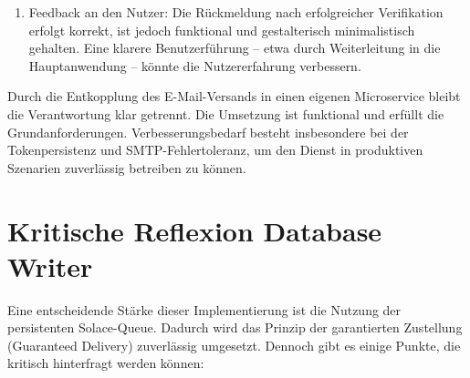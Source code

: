 \begin{enumerate}
    \item Feedback an den Nutzer: Die Rückmeldung nach erfolgreicher Verifikation erfolgt korrekt, ist jedoch funktional und gestalterisch minimalistisch gehalten. Eine klarere Benutzerführung – etwa durch Weiterleitung in die Hauptanwendung – könnte die Nutzererfahrung verbessern.
\end{enumerate}

Durch die Entkopplung des E-Mail-Versands in einen eigenen Microservice bleibt die Verantwortung klar getrennt. Die Umsetzung ist funktional und erfüllt die Grundanforderungen. Verbesserungsbedarf besteht insbesondere bei der Tokenpersistenz und SMTP-Fehlertoleranz, um den Dienst in produktiven Szenarien zuverlässig betreiben zu können.

\section{Kritische Reflexion Database Writer}
Eine entscheidende Stärke dieser Implementierung ist die Nutzung der persistenten Solace-Queue. Dadurch wird das Prinzip der garantierten Zustellung (Guaranteed Delivery) zuverlässig umgesetzt. Dennoch gibt es einige Punkte, die kritisch hinterfragt werden können:
